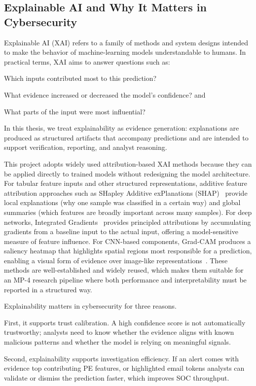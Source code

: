 \documentclass[conference]{IEEEtran}
\begin{document}
\subsection{Explainable AI and Why It Matters in Cybersecurity}

Explainable AI (XAI) refers to a family of methods and system designs intended to make the behavior of machine-learning models understandable to humans. In practical terms, XAI aims to answer questions such as:

Which inputs contributed most to this prediction?

What evidence increased or decreased the model’s confidence? and

What parts of the input were most influential?

In this thesis, we treat explainability as evidence generation: explanations are produced as structured artifacts that accompany predictions and are intended to support verification, reporting, and analyst reasoning.

This project adopts widely used attribution-based XAI methods because they can be applied directly to trained models without redesigning the model architecture. For tabular feature inputs and other structured representations, additive feature attribution approaches such as SHapley Additive exPlanations (SHAP)~\cite{LL2017} provide local explanations (why one sample was classified in a certain way) and global summaries (which features are broadly important across many samples). For deep networks, Integrated Gradients~\cite{MAQ2017} provides principled attributions by accumulating gradients from a baseline input to the actual input, offering a model-sensitive measure of feature influence. For CNN-based components, Grad-CAM produces a saliency heatmap that highlights spatial regions most responsible for a prediction, enabling a visual form of evidence over image-like representations~\cite{SCDVPB2017}. These methods are well-established and widely reused, which makes them suitable for an MP-4 research pipeline where both performance and interpretability must be reported in a structured way.

Explainability matters in cybersecurity for three reasons.

First, it supports trust calibration. A high confidence score is not automatically trustworthy; analysts need to know whether the evidence aligns with known malicious patterns and whether the model is relying on meaningful signals.

Second, explainability supports investigation efficiency. If an alert comes with evidence top contributing PE features, or highlighted email tokens analysts can validate or dismiss the prediction faster, which improves SOC throughput.
\end{document}
